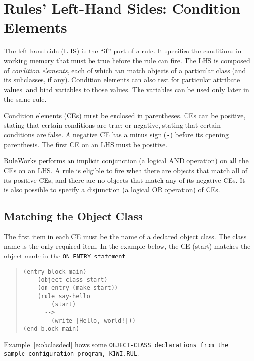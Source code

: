 \chapter{Rules' Left-Hand Sides: Condition Elements}
\label{c:conditionelements}

The left-hand side (LHS) is the ``if'' part of a rule. It specifies
the conditions in working memory that must be true before the rule can
fire. The LHS is composed of \emph{condition elements}, each of which
can match objects of a particular class (and its subclasses, if
any). Condition elements can also test for particular attribute
values, and bind variables to those values. The variables can be used
only later in the same rule.

Condition elements (CEs) must be enclosed in parentheses.  CEs can be
positive, stating that certain conditions are true; or negative,
stating that certain conditions are false. A negative CE has a minus
sign (\verb|-|) before its opening parenthesis. The first CE on an LHS
must be positive.

RuleWorks performs an implicit conjunction (a logical AND operation)
on all the CEs on an LHS. A rule is eligible to fire when there are
objects that match all of its positive CEs, and there are no objects
that match any of its negative CEs. It is also possible to specify a
disjunction (a logical OR operation) of CEs.

\section{Matching the Object Class}

The first item in each CE must be the name of a declared
object class. The class name is the only required item. In
the example below, the CE (start) matches the object made
in the \tt{ON-ENTRY} statement.

\begin{example}[h]
\begin{quote}
\begin{verbatim}
(entry-block main)
    (object-class start)
    (on-entry (make start))
    (rule say-hello
        (start)
      -->
        (write |Hello, world!|))
(end-block main)
\end{verbatim}
\end{quote}
\caption{Object Class---\tt{ON-ENTRY}}
\end{example}

Example~\ref{e:obclasdecl} hows some \tt{OBJECT-CLASS} declarations
from the sample configuration program, \tt{KIWI.RUL}.

